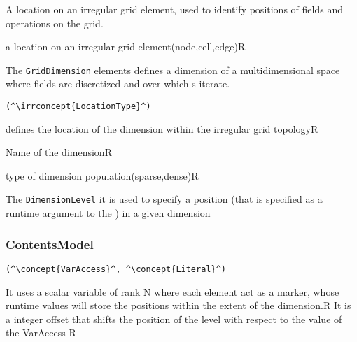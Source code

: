 A location on an irregular grid element, used to identify positions of fields and operations on the grid.

\begin{HIRAttributesVal}
	{a location on an irregular grid element}{(node,cell,edge)}{R}
\end{HIRAttributesVal}


The {\tt GridDimension} elements defines a dimension of a multidimensional space where fields are discretized and over which s iterate.

\HIRContentsModel{ }

\begin{lstlisting}[style=default,frame=none]
(^\irrconcept{LocationType}^)
\end{lstlisting}

\begin{HIRChildElements}
	{defines the location of the dimension within the irregular grid topology}{R}
\end{HIRChildElements}

\begin{HIRAttributes}
	{Name of the dimension}{R}
\end{HIRAttributes}
\begin{HIRIrrAttributesVal}
	{type of dimension population}{(sparse,dense)}{R}
\end{HIRIrrAttributesVal}


The {\tt DimensionLevel} it is used to specify a position (that is specified as a runtime argument to the ) in a given dimension

\subsubsection*{ContentsModel}{}

\begin{lstlisting}[style=default,frame=none]
(^\concept{VarAccess}^, ^\concept{Literal}^)
\end{lstlisting}

\begin{HIRChildElements}
	{It uses a scalar variable of rank N where each element act as a marker, whose runtime values will store the positions within the extent of the dimension.}{R}
	{It is a integer offset that shifts the position of the level with respect to the value of the VarAccess }{R}
\end{HIRChildElements}

